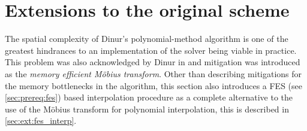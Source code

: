 \section{Extensions to the original scheme} \label{sec:ext}
The spatial complexity of Dinur's polynomial-method algorithm is one of the greatest hindrances to an implementation of the solver being viable in practice. This problem was also acknowledged by Dinur in \cite{eurocrypt-2021-30841} and mitigation was introduced as the \textit{memory efficient Möbius transform}. Other than describing mitigations for the memory bottlenecks in the algorithm, this section also introduces a FES (see \cref{sec:prereq:fes}) based interpolation procedure as a complete alternative to the use of the Möbius transform for polynomial interpolation, this is described in \cref{sec:ext:fes_interp}.
 


 
